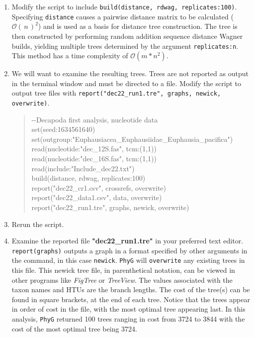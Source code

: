 \documentclass[11pt]{article}
\newcommand{\phyg}{\texttt{PhyG} }
\newcommand{\BigO}[1]{\ensuremath{\mathcal{O}\left(\,#1\,\right)}\xspace}
\begin{document}
\begin{enumerate}

\item Modify the script to include \texttt{build(distance, rdwag, replicates:100)}. 
Specifying \texttt{distance} causes a pairwise distance matrix to be calculated 
($\BigO n^2$) and is used as a basis for distance tree construction. The tree is 
then constructed by performing random addition sequence distance Wagner 
builds, yielding multiple trees determined by the argument \texttt{replicates:n}. 
This method has a time complexity of $\mathcal{O} \left( m*n^2 \right)$.

\item We will want to examine the resulting trees. Trees are not reported as 
output in the terminal window and must be directed to a file. Modify the script 
to output tree files with \texttt{report("dec22\_run1.tre", graphs, newick, overwrite)}.

	\begin{quote}	
	-\/-Decapoda first analysis, nucleotide data\\
	set(seed:1634561640)\\
	set(outgroup:"Euphausiacea\_Euphausiidae\_Euphausia\_pacifica")\\
	read(nucleotide:"dec\_12S.fas", tcm:(1,1))\\
	read(nucleotide:"dec\_16S.fas", tcm:(1,1))\\
	read(include:"Include\_dec22.txt")\\
	build(distance, rdwag, replicates:100)\\
	report("dec22\_cr1.csv", crossrefs, overwrite)\\
	report("dec22\_data1.csv", data, overwrite)\\
	report("dec22\_run1.tre", graphs, newick, overwrite)
	\end{quote}
	
\item Rerun the script.
	
\item Examine the reported file \textbf{"dec22\_run1.tre"} in your preferred text editor. 
\texttt{report(graphs)} outputs a graph in a format specified by other arguments in the 
command, in this case \texttt{newick}. \phyg will \texttt{overwrite} any existing trees in 
this file. This newick tree file, in parenthetical notation, can be viewed in other programs 
like \textit{FigTree} or \textit{TreeView}. The values associated with the taxon names and 
HTUs are the branch lengths. The cost of the tree(s) can be found in square brackets, at 
the end of each tree. Notice that the trees appear in order of cost in the file, with the most 
optimal tree appearing last. In this analysis, \phyg returned 100 trees ranging in cost from 
3724 to 3844 with the cost of the most optimal tree being 3724.

\end{enumerate}
\end{document}
